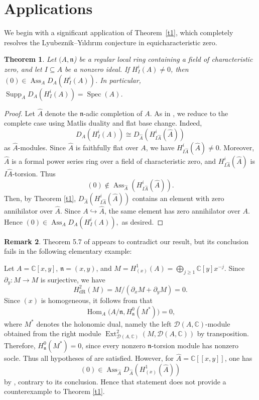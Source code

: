 \documentclass[11pt]{amsart}
\newtheorem{theorem}{Theorem}[section]
\theoremstyle{definition}
\newtheorem{remark}[theorem]{Remark}
\newcommand{\n}{\mathfrak n}
\newcommand{\D}{\mathcal D}
\DeclareMathOperator{\Ass}{Ass}
\DeclareMathOperator{\Hom}{Hom}
\begin{document}
\section{Applications}
We begin with a significant application of Theorem~\ref{t1}, which completely resolves the Lyubeznik--Y{\i}ld{\i}r{\i}m conjecture in equicharacteristic zero.
\begin{theorem}\label{t2}
Let $(A,\n$) be a regular local ring containing a field of characteristic zero, and let $I\subseteq A$ be a nonzero ideal. If $H_I^i(A)\neq0$, then $(0)\in\operatorname{Ass}_A D_A(H_I^i(A))$. In particular, $\operatorname{Supp}_A D_A(H_I^i(A))=\operatorname{Spec}(A)$.
\end{theorem}
\begin{proof}
Let $\widehat A$ denote the $\n$-adic completion of $A$. As in \cite[Remark 4.1.1]{Hel07}, we reduce to the complete case using Matlis duality and flat base change. Indeed,
\[
D_A(H_I^i(A))
\cong D_{\widehat A}(H_{I\widehat A}^i(\widehat A))
\]
as $\widehat  A$-modules. Since $\widehat A$ is faithfully flat over $A$, we have $H_{I\widehat A}^i(\widehat A)\neq0$. Moreover, $\widehat A$ is a formal power series ring over a field of characteristic zero, and $H_{I\widehat A}^i(\widehat A)$ is $I\widehat A$-torsion. Thus
\[
(0)\notin\operatorname{Ass}_{\widehat A}
(H_{I\widehat A}^i(\widehat A)).
\]
Then, by Theorem \ref{t1}, $D_{\widehat A}(H_{I\widehat A}^i(\widehat A))$ contains an element with zero annihilator over $\widehat A$. Since $A\hookrightarrow\widehat A$, the same element has zero annihilator over $A$. Hence $(0)\in\operatorname{Ass}_A D_A(H_I^i(A)),$ as desired.
\end{proof}

\begin{remark}\label{r3} Theorem 5.7 of \cite{BE} appears to contradict our result, but its conclusion fails in the following elementary example:


Let $A=\mathbb C[x,y]$, $\n=(x,y)$, and $M=H_{(x)}^1(A) =\bigoplus_{j\ge1}\mathbb C[y]x^{-j}.$
Since $\partial_y:M\to M$ is surjective, we have
\[
H_{\mathrm{dR}}^2(M)
=M/(\partial_xM+\partial_yM)=0.
\]
Since $(x)$ is homogeneous, it follows from \cite[Lemma 1.4 and Remark 2.3]{RWZ22} that
\[
\Hom_A \bigl(A/\n,H_{\n}^0(M^*)\bigr)=0,
\]
where $M^*$ denotes the holonomic dual, namely the left $\D(A,\mathbb C)$-module obtained from the right module $\operatorname{Ext}^2_{\D(A,\mathbb C)} (M,\D(A,\mathbb C))$ by transposition. Therefore, $H_{\n}^0(M^*)=0$, since every nonzero $\n$-torsion module has nonzero socle. Thus all hypotheses of \cite[Theorem 5.7]{BE} are satisfied. However, for $\widehat A=\mathbb C[[x,y]]$, one has
\[
(0)\in\Ass_{\widehat A}
D_{\widehat A}\!\left(H_{(x)}^1(\widehat A)\right)
\]
by \cite[Example 2.4]{HS07}, contrary to its conclusion. Hence that statement does not provide a counterexample to Theorem \ref{t1}.
\end{remark}
\end{document}
